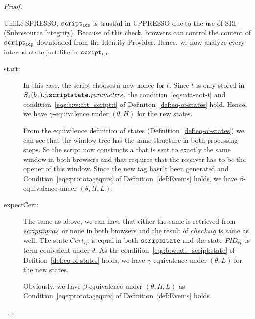 \begin{theorem}
\begin{proof}
\begin{description}
\begin{description}
\begin{enumerate}
            Unlike SPRESSO, $\mathtt{script_{idp}}$ is trustful in
            UPPRESSO due to the use of SRI (Subresource Integrity).
            Because of this check, browsers can control the 
            content of $\mathtt{script_{idp}}$ downloaded from 
            the Identity Provider. Hence, we now analyze every 
            internal state just like in $\mathtt{script_{rp}}$.
  
            \begin{description}
            \item[start:] In this case, the script chooses a
              new nonce for $t$. Since $t$ is only stored in
              $S_1(b_1).j.\mathtt{scriptstate}.\mathit{parameters}$,
              the condition~\ref{eqs:att-not-t} and 
              condition~\ref{eqs:b:w:att_script:t} of 
              Definiton~\ref{def:eq-of-states} hold. Hence, 
              we have $\gamma$-equivalence under $(\theta,H)$ 
              for the new states.
  
              From the equivalence definition of states
              (Definition~\ref{def:eq-of-states}) we can see 
              that the window tree has the same structure in 
              both processing steps. 
              So the script now constructs a \pm that is sent to 
              exactly the same window in both browsers and that 
              requires that the receiver has to be the opener
              of this window. Since the new tag hasn't been 
              generated and Condition~\ref{eqe:prototagequiv} 
              of Definition~\ref{def:Events} holds, we have 
              $\beta$-equivalence under $(\theta,H,L)$.
            \item[expectCert:] The same as above, we can have 
              that either the same \pm is retrieved from 
              $\mathit{scriptinputs}$ or none in both browsers and 
              the result of $checksig$ is same as well. The 
              state $Cert_{rp}$ is equal in both 
              $\mathtt{scriptstate}$ and the state $PID_{rp}$ is
              term-equivalent under $\theta$. As the 
              condition~\ref{eqs:b:w:att_script:state} of 
              Defition~\ref{def:eq-of-states} holds, we have 
              $\gamma$-equivalence under $(\theta,L)$ for the 
              new states.
  
              Obviously, we have $\beta$-equivalence under 
              $(\theta,H,L)$ as Condition~\ref{eqe:prototagequiv} 
              of Definition~\ref{def:Events} holds.
  

\end{description}
\end{enumerate}
\end{description}
\end{description}
\end{proof}
\end{theorem}
